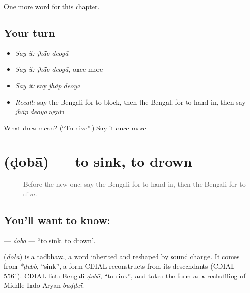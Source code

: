 \begin{grammarlens}[title={What you've built}]
One more word for this chapter.
\end{grammarlens}

\subsection*{Your turn}
\begin{itemize}
\raggedright
  \item \emph{Say it:} \emph{jhā̃p deoyā}
  \item \emph{Say it:} \emph{jhā̃p deoyā}, once more
  \item \emph{Say it:} say \emph{jhā̃p deoyā}
  \item \emph{Recall:} say the Bengali for to block, then the Bengali for to hand in, then say \emph{jhā̃p deoyā} again
\end{itemize}

\begin{tcolorbox}[breakable,colback=teal!4,colframe=teal!35!black,title={Before you move on}]
What does   mean? (\textquotedblleft{}To dive\textquotedblright{}.) Say it once more.
\end{tcolorbox}
\section[\texorpdfstring{\bn{ডোবা} (ḍobā)}{ডোবা (ḍobā)}]{ (ḍobā) — to sink, to drown}

\label{lesson:BN-C240-doba}



\begin{quote}
Before the new one: say the Bengali for to hand in, then the Bengali for to dive.
\end{quote}

\subsection*{You'll want to know: }
\textbf{} — \emph{ḍobā} — \textquotedblleft{}to sink, to drown\textquotedblright{}.

\begin{cousinweb}
\textbf{} (\emph{ḍobā}) is a tadbhava, a word inherited and reshaped by sound change. It comes from \emph{*ḍubb}, \textquotedblleft{}sink\textquotedblright{}, a form CDIAL reconstructs from its descendants (CDIAL 5561). CDIAL lists Bengali \emph{ḍubā}, \textquotedblleft{}to sink\textquotedblright{}, and takes the form as a reshuffling of Middle Indo-Aryan \emph{buḍḍaï}.
\end{cousinweb}

